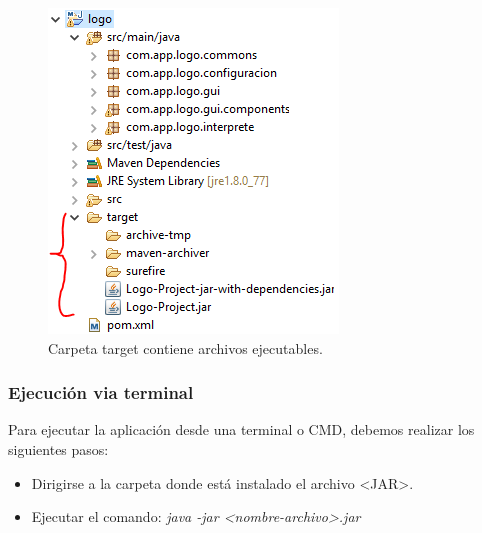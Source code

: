 \begin{itemize}
	\begin{figure}[H]
		\begin{center}
			\includegraphics[scale=.4]{images/ejecucion_entorno/eclipse/img_eclipse_4}
			\caption{Carpeta target contiene archivos ejecutables.}
		\end{center}
	\end{figure}
	
\end{itemize}

\subsubsection{Ejecución via terminal}
Para ejecutar la aplicación desde una terminal o CMD, debemos realizar los siguientes pasos:

\begin{itemize}
	\item Dirigirse a la carpeta donde está instalado el archivo <JAR>.
	\item Ejecutar el comando: \textit{java -jar <nombre-archivo>.jar}
\end{itemize}